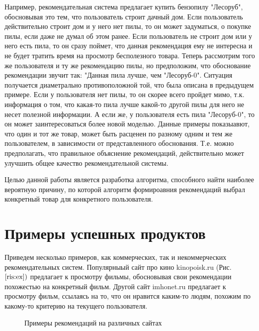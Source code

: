 \documentclass[12pt,a4paper]{report}
\begin{document}
Например, рекомендательная система предлагает купить бензопилу "Лесоруб", обосновывая это тем, что пользователь строит дачный дом. Если пользователь действительно строит дом и у него нет пилы, то он может задуматься, о покупке пилы, если даже не думал об этом ранее. Если пользователь не строит дом или у него есть пила, то он сразу поймет, что данная рекомендация ему не интересна и не будет тратить время на просмотр бесполезного товара.
Теперь рассмотрим того же пользователя и ту же рекомендацию пилы, но предположим, что обоснование рекомендации звучит так: "Данная пила лучше, чем "Лесоруб-0".
Ситуация получается диаметрально противоположной той, что была описана в предыдущем примере. Если у пользователя нет пилы, то он скорее всего пройдет мимо, т.к. информация о том, что какая-то пила лучше какой-то другой пилы для него не несет полезной информации. А если же, у пользователя есть пила "Лесоруб-0", то он может заинтересоваться более новой моделью.
Данные примеры показыавют, что один и тот же товар, может быть расценен по разному одним и тем же пользователем, в зависимости от представленного обоснования. Т.е. можно предполагать, что правильное объяснение рекомендаций, действительно может улучшить общее качество рекомендательной системы.

Целью данной работы является разработка алгоритма, способного найти наиболее вероятную причину, по которой алгоритм формироавния рекомендаций выбрал конкретный товар для конкретного пользователя.

\section{Примеры успешных продуктов}
Приведем несколько примеров, как коммерческих, так и некоммерческих рекомендательных систем.
Популярныый сайт про кино kinopoisk.ru (Рис. $\ref{ris:ex})$ предлагает к просмотру фильмы, обосновывая свои рекомендации похожестью на конкретный фильм.
Другой сайт imhonet.ru предлагает к просмотру фильм, ссылаясь на то, что он нравится каким-то людям, похожим по какому-то критерию на текущего пользователя.
\begin{figure}[H]
\begin{minipage}[h]{0.49\linewidth}
\end{minipage}
\hfill
\begin{minipage}[h]{0.49\linewidth}
\end{minipage}
\caption{Примеры рекомендаций на различных сайтах}
\label{ris:ex}
\end{figure}
\end{document}
